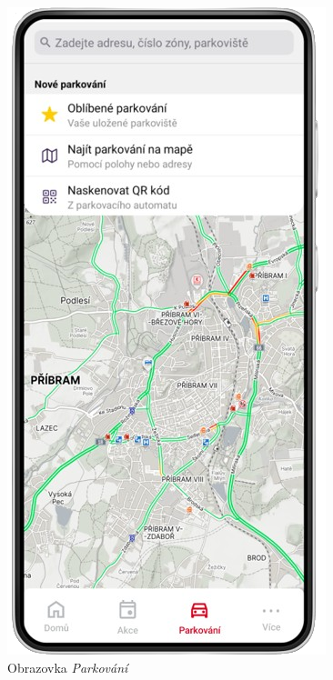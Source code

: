 \begin{figure}[H]
  \includegraphics[width=\linewidth]{screen3.png}
  \caption{Obrazovka \textit{Parkování}}
\endminipage\hfill
{}

\end{figure}
